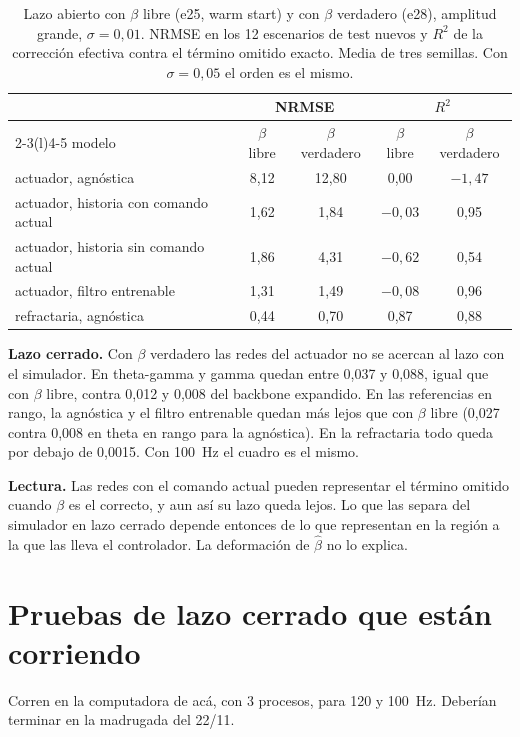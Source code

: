 \documentclass[11pt,a4paper]{article}
\newcommand{\bh}{\hat\beta}
\begin{document}
\begin{table}[H]
\centering
\small
\caption{Lazo abierto con $\beta$ libre (e25, warm start) y con $\beta$ verdadero (e28), amplitud grande, $\sigma = 0{,}01$. NRMSE en los 12 escenarios de test nuevos y $R^2$ de la corrección efectiva contra el término omitido exacto. Media de tres semillas. Con $\sigma = 0{,}05$ el orden es el mismo.}
\label{tab:e28}
\begin{tabular}{@{}lcccc@{}}
\toprule
& \multicolumn{2}{c}{NRMSE} & \multicolumn{2}{c}{$R^2$} \\
\cmidrule(lr){2-3}\cmidrule(l){4-5}
modelo & $\beta$ libre & $\beta$ verdadero & $\beta$ libre & $\beta$ verdadero \\
\midrule
actuador, agnóstica & 8,12 & 12,80 & 0,00 & $-1{,}47$ \\
actuador, historia con comando actual & 1,62 & 1,84 & $-0{,}03$ & 0,95 \\
actuador, historia sin comando actual & 1,86 & 4,31 & $-0{,}62$ & 0,54 \\
actuador, filtro entrenable & 1,31 & 1,49 & $-0{,}08$ & 0,96 \\
refractaria, agnóstica & 0,44 & 0,70 & 0,87 & 0,88 \\
\bottomrule
\end{tabular}
\end{table}

\textbf{Lazo cerrado.} Con $\beta$ verdadero las redes del actuador no se acercan al lazo con el simulador. En theta-gamma y gamma quedan entre 0,037 y 0,088, igual que con $\beta$ libre, contra 0,012 y 0,008 del backbone expandido. En las referencias en rango, la agnóstica y el filtro entrenable quedan más lejos que con $\beta$ libre (0,027 contra 0,008 en theta en rango para la agnóstica). En la refractaria todo queda por debajo de 0,0015. Con 100~Hz el cuadro es el mismo.

\textbf{Lectura.} Las redes con el comando actual pueden representar el término omitido cuando $\beta$ es el correcto, y aun así su lazo queda lejos. Lo que las separa del simulador en lazo cerrado depende entonces de lo que representan en la región a la que las lleva el controlador. La deformación de $\bh$ no lo explica.

\section{Pruebas de lazo cerrado que están corriendo}

Corren en la computadora de acá, con 3 procesos, para 120 y 100~Hz. Deberían terminar en la madrugada del 22/11.
\end{document}
